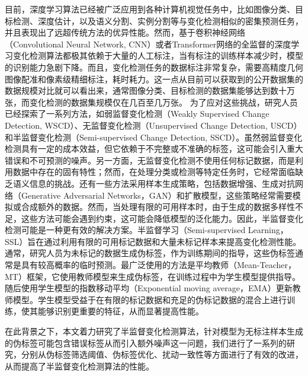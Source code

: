 \documentclass[lang=chs, degree=master, blindreview=false, adobe=false]{yanputhesis}
\begin{document}
目前，深度学习算法已经被广泛应用到各种计算机视觉任务中，比如图像分类、目标检测、深度估计，以及语义分割、实例分割等与变化检测相似的密集预测任务，并且表现出了远超传统方法的优异性能。然而，基于卷积神经网络\cite{daudt2018FC-EF}\cite{BIFA2024}\cite{crossRES2023szw}（Convolutional Neural Network, CNN）或者Transformer网络\cite{chen2021BIT}\cite{Bandara2022changeformer}的全监督的深度学习变化检测算法都极其依赖于大量的人工标注，当有标注的训练样本减少时，模型的识别能力急剧下降。而且，变化检测任务的数据标注非常复杂，需要高精度几何图像配准和像素级精细标注，耗时耗力。这一点从目前可以获取到的公开数据集的数据规模对比就可以看出来，通常图像分类、目标检测的数据集能够达到数十万张，而变化检测的数据集规模仅在几百至几万张。
为了应对这些挑战，研究人员已经探索了一系列方法，如弱监督变化检测\cite{wu2023fcdgan}\cite{WSCD_TGRS24}\cite{WSCD_TGRS24_2}（Weakly Supervised Change Detection, WSCD）、无监督变化检测\cite{bandara2023USCD}\cite{USCD_JSTARS23}\cite{USCD_TGRS22}（Unsupervised Change Detection, USCD）和半监督变化检测\cite{peng2021SemiCDNet}\cite{bandara2022RCR}\cite{Zhang2023FPA}（Semi-supervised Change Detection, SSCD）。虽然弱监督变化检测具有一定的成本效益，但它依赖于不完整或不准确的标签，这可能会引入重大错误和不可预测的噪声。另一方面，无监督变化检测不使用任何标记数据，而是利用数据中存在的固有特性；然而，在处理分类或检测等特定任务时，它经常面临缺乏语义信息的挑战。还有一些方法采用样本生成策略，包括数据增强\cite{IAug2022}\cite{augmentaion_23}、生成对抗网络\cite{gen_sample_TGRS21}（Generative Adversarial Networks，GAN）和扩散模型\cite{bandara2022ddpm}，这些策略经常需要模拟或合成额外的数据。然而，当处理有限的可用样本时，由于生成的数据多样性不足，这些方法可能会遇到约束，这可能会降低模型的泛化能力。因此，半监督变化检测可能是一种更有效的解决方案。半监督学习\cite{Tarvainen2017teacher}\cite{ran2023DTFSeg}\cite{ran2024semi}（Semi-supervised Learning，SSL）旨在通过利用有限的可用标记数据和大量未标记样本来提高变化检测性能。通常，研究人员为未标记的数据生成伪标签，作为训练期间的指导，这些伪标签通常是具有较高概率的临时预测。最广泛使用的方法是平均教师\cite{Tarvainen2017teacher}（Mean-Teacher，MT）框架，它使用教师模型来生成伪标签，在训练过程中为学生模型提供指导。随后使用学生模型的指数移动平均\cite{cai2021ema}（Exponential moving average，EMA）更新教师模型。学生模型受益于在有限的标记数据和充足的伪标记数据的混合上进行训练，使其能够识别更重要的特征，从而显著提高性能。

在此背景之下，本文着力研究了半监督变化检测算法，针对模型为无标注样本生成的伪标签可能包含错误标签从而引入额外噪声这一问题，我们进行了一系列的研究，分别从伪标签筛选阈值、伪标签优化、扰动一致性等方面进行了有效的改进，从而提高了半监督变化检测算法的性能。
\end{document}
